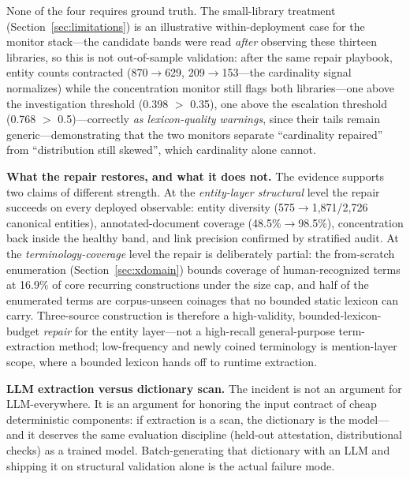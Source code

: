 \documentclass[preprint,12pt]{elsarticle}
\begin{document}
None of the four requires ground truth. The small-library treatment
(Section~\ref{sec:limitations}) is an illustrative within-deployment
case for the monitor stack---the candidate bands were read \emph{after}
observing these thirteen libraries, so this is not out-of-sample
validation: after the same repair playbook, entity counts contracted
(870$\to$629, 209$\to$153---the cardinality signal normalizes) while the
concentration monitor still flags both libraries---one above the
investigation threshold (0.398 $>$ 0.35), one above the escalation
threshold (0.768 $>$ 0.5)---correctly \emph{as lexicon-quality
warnings}, since their tails remain
generic---demonstrating that
the two monitors separate ``cardinality repaired'' from ``distribution
still skewed'', which cardinality alone cannot.

\textbf{What the repair restores, and what it does not.} The evidence
supports two claims of different strength. At the \emph{entity-layer
structural} level the repair succeeds on every deployed observable:
entity diversity (575$\to$1{,}871/2{,}726 canonical entities),
annotated-document coverage (48.5\%$\to$98.5\%), concentration back
inside the healthy band, and link precision confirmed by stratified
audit. At the \emph{terminology-coverage} level the repair is
deliberately partial: the from-scratch enumeration
(Section~\ref{sec:xdomain}) bounds coverage of human-recognized
terms at 16.9\% of core recurring constructions under the size cap,
and half of the enumerated terms are corpus-unseen coinages that no
bounded static lexicon can carry. Three-source construction is
therefore a high-validity, bounded-lexicon-budget \emph{repair} for
the entity layer---not a high-recall general-purpose term-extraction
method; low-frequency and newly coined terminology is mention-layer
scope, where a bounded lexicon hands off to runtime extraction.

\textbf{LLM extraction versus dictionary scan.} The incident is not an
argument for LLM-everywhere. It is an argument for honoring the input
contract of cheap deterministic components: if extraction is a scan, the
dictionary is the model---and it deserves the same evaluation discipline
(held-out attestation, distributional checks) as a trained model.
Batch-generating that dictionary with an LLM and shipping it on structural
validation alone is the actual failure mode.
\end{document}
